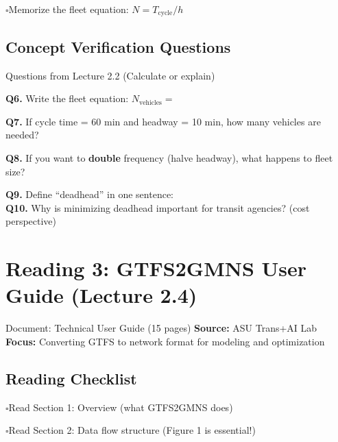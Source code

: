 \documentclass[11pt,letterpaper]{article}
\newcommand{\cmark}{$\square$\hspace{0.3em}}
\newcommand{\fillin}{\underline{\hspace{2cm}}}
\begin{document}
\cmark Memorize the fleet equation: $N = T_{\text{cycle}} / h$

\subsection*{Concept Verification Questions}

\begin{questionbox}{Questions from Lecture 2.2 (Calculate or explain)}

\textbf{Q6.} Write the fleet equation: $N_{\text{vehicles}} = $ \fillin

\vspace{0.2cm}
\textbf{Q7.} If cycle time = 60 min and headway = 10 min, how many vehicles are needed? \fillin

\vspace{0.2cm}
\textbf{Q8.} If you want to \textbf{double} frequency (halve headway), what happens to fleet size? \fillin

\vspace{0.2cm}
\textbf{Q9.} Define ``deadhead'' in one sentence:\\[0.8cm]

\textbf{Q10.} Why is minimizing deadhead important for transit agencies? (cost perspective)\\[1cm]

\end{questionbox}

\section{Reading 3: GTFS2GMNS User Guide (Lecture 2.4)}

\begin{readingbox}{Document: Technical User Guide (15 pages)}
\textbf{Source:} ASU Trans+AI Lab\\
\textbf{Focus:} Converting GTFS to network format for modeling and optimization
\end{readingbox}

\subsection*{Reading Checklist}

\cmark Read Section 1: Overview (what GTFS2GMNS does)

\cmark Read Section 2: Data flow structure (Figure 1 is essential!)
\end{document}
